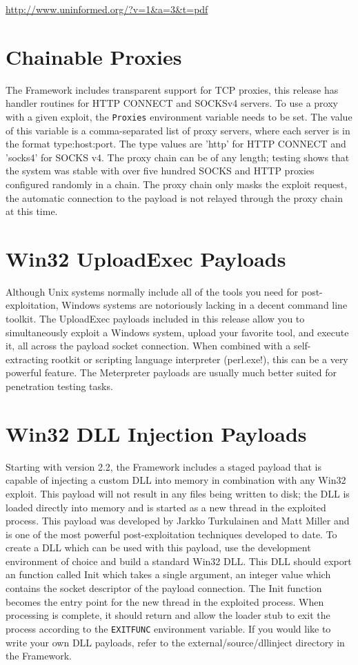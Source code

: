 \documentclass{report}
\begin{document}
\url{http://www.uninformed.org/?v=1&a=3&t=pdf}

\section{Chainable Proxies}
\par
The Framework includes transparent support for TCP proxies, this release has
handler routines for HTTP CONNECT and SOCKSv4 servers. To use a proxy with a
given exploit, the \texttt{Proxies} environment variable needs to be set. The value of
this variable is a comma-separated list of proxy servers, where each server is
in the format type:host:port. The type values are 'http' for HTTP CONNECT and
'socks4' for SOCKS v4. The proxy chain can be of any length; testing shows that
the system was stable with over five hundred SOCKS and HTTP proxies configured
randomly in a chain. The proxy chain only masks the exploit request, the
automatic connection to the payload is not relayed through the proxy chain at
this time. 

\section{Win32 UploadExec Payloads}
\par
Although Unix systems normally include all of the tools you need for
post-exploitation, Windows systems are notoriously lacking in a decent command
line toolkit. The UploadExec payloads included in this release allow you to
simultaneously exploit a Windows system, upload your favorite tool, and execute
it, all across the payload socket connection. When combined with a
self-extracting rootkit or scripting language interpreter (perl.exe!), this can
be a very powerful feature. The Meterpreter payloads are usually much better
suited for penetration testing tasks.  

\section{Win32 DLL Injection Payloads}
\par
Starting with version 2.2, the Framework includes a staged payload that is
capable of injecting a custom DLL into memory in combination with any Win32
exploit. This payload will not result in any files being written to disk; the
DLL is loaded directly into memory and is started as a new thread in the
exploited process. This payload was developed by Jarkko Turkulainen and Matt
Miller and is one of the most powerful post-exploitation techniques developed
to date. To create a DLL which can be used with this payload, use the
development environment of choice and build a standard Win32 DLL. This DLL
should export an function called Init which takes a single argument, an
integer value which contains the socket descriptor of the payload connection.
The Init function becomes the entry point for the new thread in the exploited
process. When processing is complete, it should return and allow the loader
stub to exit the process according to the \texttt{EXITFUNC} environment
variable. If you would like to write your own DLL payloads, refer to the
external/source/dllinject directory in the Framework. 
\end{document}
